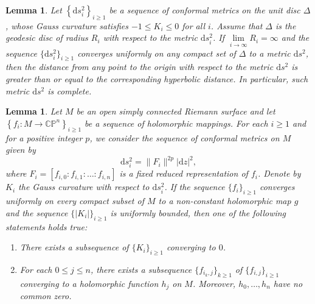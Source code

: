 \documentclass[english, 12pt]{amsart}
\theoremstyle{plain}
\newtheorem{lem}[thm]{{Lemma}}
\theoremstyle{remark}
\numberwithin{equation}{section}
\theoremstyle{plain}
\theoremstyle{named}
\begin{document}
\begin{lem}\cite[Lemma 2.2]{Osserman-Ru97}
	\label{compare with the hyperbolic distance, after passing limit} 
	Let $\left\{\mathrm{d}s_i^2\right\}_{i\geq 1}$ be a sequence of conformal metrics on the unit disc $\Delta$, whose Gauss curvature satisfies $-1\leq K_i\leq 0$ for all $i$. Assume that $\Delta$ is the geodesic disc of radius $R_i$ with respect to the metric $\mathrm{d}s_i^2$. If $\lim\limits_{i\to\infty} R_i=\infty$ and the sequence $\{\mathrm{d}s_i^2\}_{i\geq 1}$ converges uniformly on any compact set of $\Delta$ to a metric $\mathrm{d}s^2$, then the distance from any point to the origin with respect to the metric $\mathrm{d}s^2$ is greater than or equal to the corresponding hyperbolic distance. In particular, such metric $\mathrm{d}s^2$ is complete.
\end{lem}

\begin{lem}\cite[Proposition 1]{Chen-Li-Liu-Ru21}
	\label{limit of curvatures}
	Let $M$ be an open simply connected Riemann surface and let $\left\{f_i\colon M\rightarrow\mathbb{CP}^n\right\}_{i\geq 1}$ be a sequence of holomorphic mappings. For each $i\geq 1$ and for a positive integer $p$, we consider the sequence of conformal metrics on $M$ given by
	\[
	\mathrm{d}s_i^2=\|F_i\|^{2p}|\mathrm{d}z|^2,
	\]
	where $F_i=[f_{i,0}:f_{i,1}:\dots:f_{i,n}]$ is a fixed reduced representation of $f_i$. Denote by $K_i$ the Gauss curvature with respect to $\mathrm{d}s_i^2$. If the sequence $\{f_i\}_{i\geq 1}$ converges uniformly on every compact subset of $M$ to a non-constant holomorphic map $g$ and the sequence $\{|K_i|\}_{i\geq 1}$ is uniformly bounded, then one of the following statements holds true:
	\begin{enumerate}
		\item There exists a subsequence of $\{K_i\}_{i\geq 1}$ converging to $0$.
		\item For each $0\leq j\leq n$, there exists a subsequence $\{f_{i_k,j}\}_{k\geq 1}$ of $\{f_{i,j}\}_{i\geq 1}$ converging to a holomorphic function $h_j$ on $M$. Moreover, $h_0,\dots,h_n$ have no common zero.
	\end{enumerate}
\end{lem}
\end{document}
